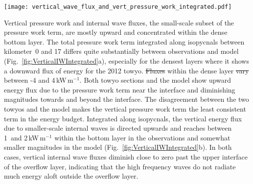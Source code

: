 \documentclass{ametsocV6.1}
\providecommand{\DIFadd}[1]{{\protect\color{blue}\uwave{#1}}} %
\providecommand{\DIFdel}[1]{{\protect\color{red}\sout{#1}}}                      %
\providecommand{\DIFaddbegin}{} %
\providecommand{\DIFaddend}{} %
\providecommand{\DIFdelbegin}{} %
\providecommand{\DIFdelend}{} %
\begin{document}
\begin{figure*}
\centerline{\texttt{[image: vertical\_wave\_flux\_and\_vert\_pressure\_work\_integrated.pdf]}}
\caption{
Vertical pressure work integrated horizontally along isopycnals (for towyo observations) and isotherms (for model output) between kilometer~0 and~17.
The dashed lines indicate the upper interface of the dense bottom layer at $\sigma_4=45.94$\,kg\,m$^{-3}$ in the observations and, correspondingly in the temperature-only stratified model, $\theta=0.9^{\circ}$C or $\theta=0.8^{\circ}$ (see text).
Vertical pressure work is shown for all scales in (a) and for lateral scales of less than 5\,km termed \emph{internal waves} in the text in (b).
Note the different x-axis limits between the two panels.
Model small-scale internal wave fluxes are calculated based on locally defined perturbation pressure and velocity (pink). 
For comparison, small-scale internal wave fluxes calculated based on high-pass filtered model velocity and pressure time series (see Appendix~B) are shown in orange. 
}
\label{fig:VerticalIWIntegrated}
\end{figure*}

Vertical pressure work and internal wave fluxes, the small-scale subset of the pressure work term, are mostly upward and concentrated within the dense bottom layer.
The total pressure work term integrated along isopycnals between kilometer~0 and 17 differs quite substantially between observations and model (Fig.~\ref{fig:VerticalIWIntegrated}a), especially for the densest layers where it shows a downward flux of energy for the 2012 towyo. 
\DIFdelbegin \DIFdel{Fluxes }\DIFdelend \DIFaddbegin \DIFadd{Pressure work }\DIFaddend within the dense layer \DIFdelbegin \DIFdel{vary }\DIFdelend \DIFaddbegin \DIFadd{varies }\DIFaddend between -4 and 4\,kW\,m$^{-1}$. 
Both towyo sections and the model show upward energy flux due to the pressure work term near the interface and diminishing magnitudes towards and beyond the interface.
The disagreement between the two towyos and the model makes the vertical pressure work term the least consistent term in the energy budget.
Integrated along isopycnals, the vertical energy flux due to smaller-scale internal waves is directed upwards and reaches between 1~and 2\,kW\,m$^{-1}$ within the bottom layer in the observations and somewhat smaller magnitudes in the model (Fig.~\ref{fig:VerticalIWIntegrated}b).
In both cases, vertical internal wave fluxes diminish close to zero past the upper interface of the overflow layer, indicating that the high frequency waves do not radiate much energy aloft outside the overflow layer.
\end{document}
